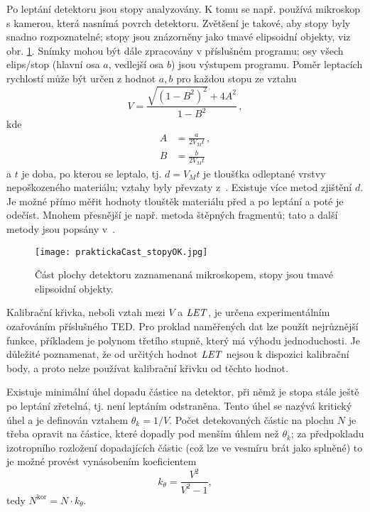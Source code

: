 Po leptání detektoru jsou stopy analyzovány. K tomu se např. používá mikroskop s kamerou, která nasnímá povrch detektoru. Zvětšení je takové, aby stopy byly snadno rozpoznatelné; stopy jsou znázorněny jako tmavé elipsoidní objekty, viz obr. \ref{fig:detektory_stopy}. Snímky mohou být dále zpracovány v příslušném programu; osy všech elips/stop (hlavní osa $a$, vedlejší osa $b$) jsou výstupem programu. 
Poměr leptacích rychlostí může být určen z hodnot $a,b$ pro každou stopu ze vztahu
\begin{equation}
  V=\frac{\sqrt{\left( 1-B^2 \right)^2}+4A^2}{1-B^2}\,,
  \label{eq:pomerLepRychlosti}
\end{equation}
kde
\begin{align*}
  A&=\frac{a}{2V_Mt}\,,\\
  B&=\frac{b}{2V_Mt}
\end{align*}
a $t$ je doba, po kterou se leptalo, tj. $d=V_Mt$ je tloušťka odleptané vrstvy nepoškozeného materiálu; vztahy byly převzaty z~\cite{ssntd}. Existuje více metod zjištění $d$. Je možné přímo měřit hodnoty tlouštěk materiálu před a po leptání a poté je odečíst. Mnohem přesnější je např. metoda štěpných fragmentů; tato a další metody jsou popsány v~\cite{thesisKPBrabcova}.    
\begin{figure}[ht]
  \centering
  \texttt{[image: praktickaCast\_stopyOK.jpg]}
  \caption{Část plochy detektoru zaznamenaná mikroskopem, stopy jsou tmavé elipsoidní objekty.}
  \label{fig:detektory_stopy}
\end{figure}

Kalibrační křivka, neboli vztah mezi $V$ a $\mathit{LET}$, je určena experimentálním ozařováním příslušného TED. Pro proklad naměřených dat lze použít nejrůznější funkce, příkladem je polynom třetího stupně, který má výhodu jednoduchosti. Je důležité poznamenat, že od určitých hodnot $\mathit{LET}$ nejsou k dispozici kalibrační body, a proto nelze používat kalibrační křivku od těchto hodnot.

Existuje minimální úhel dopadu částice na detektor, při němž je stopa stále ještě po leptání zřetelná, tj. není leptáním odstraněna. Tento úhel se nazývá kritický úhel a je definován vztahem $\theta_k=1/V$. Počet detekovaných částic na plochu $N$ je třeba opravit na částice, které dopadly pod menším úhlem než $\theta_k$; za předpokladu izotropního rozložení dopadajících částic (což lze ve vesmíru brát jako splněné) to je možné provést vynásobením koeficientem 
\begin{equation}
  k_{\theta}=\frac{V^2}{V^2-1},
  \label{eq:kritickyUhel}
\end{equation}
tedy $N^{\text{kor}}=N\cdot k_{\theta}$. 

